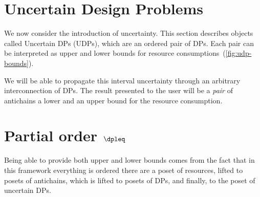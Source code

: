 \section{Uncertain Design Problems}
\label{sec:UDP}

We now consider the introduction of uncertainty. This section describes
objects called Uncertain DPs (UDPs), which are an ordered pair of
DPs. Each pair can be interpreted as upper and lower bounds for resource
consumptions~(\cref{fig:udp-bounds}).


We will be able to propagate this interval uncertainty through an
arbitrary interconnection of DPs. The result presented to the user
will be a \emph{pair} of antichains \textemdash{} a lower and an upper
bound for the resource consumption.

\section{Partial order $\dpleq$}

Being able to provide both upper and lower bounds comes from the fact
that in this framework everything is ordered \textendash{} there are
a poset of resources, lifted to posets of antichains, which is lifted
to posets of DPs, and finally, to the poset of uncertain DPs.

